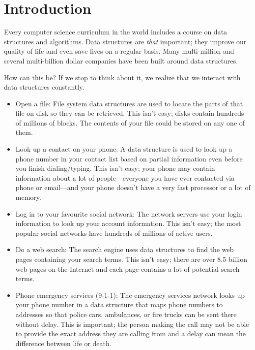 \chapter{Introduction}

Every computer science curriculum in the world includes a course on data
structures and algorithms.  Data structures are \emph{that} important;
they improve our quality of life and even save lives on a regular basis.
Many multi-million and several multi-billion dollar companies have been
built around data structures.

How can this be?  If we stop to think about it, we realize that we
interact with data structures constantly.
\begin{itemize}
  \item  Open a file: File system 
    data structures are used to locate
    the parts of that file on disk so they can be retrieved.  This isn't
    easy; disks contain hundreds of millions of blocks.  The contents of your
    file could be stored on any one of them.
  \item Look up a contact on your phone:  A data
    structure is used to look up a phone number in your contact list
    based on partial
    information even before you finish dialing/typing.  This isn't easy;
    your phone may contain information about a lot of people---everyone
    you have ever contacted via phone or email---and your phone doesn't
    have a very fast processor or a lot of memory.
  \item Log in to your favourite social network:
    The network servers
    use your login information to look up your account information.
    This isn't easy; the most popular social networks have hundreds of
    millions of active users.
  \item Do a web search:
    The search engine uses data structures to find
    the web pages containing your search terms.  This isn't easy; there
    are over 8.5 billion web pages on the Internet and each page contains
    a lot of potential search terms.
  \item Phone emergency services (9-1-1):
    The emergency services network
    looks up your phone number in a data structure that maps phone numbers
    to addresses so that police cars, ambulances, or fire trucks can be
    sent there without delay. This is important;  the person making the
    call may not be able to provide the exact address they are calling
    from and a delay can mean the difference between life or death.
\end{itemize}

